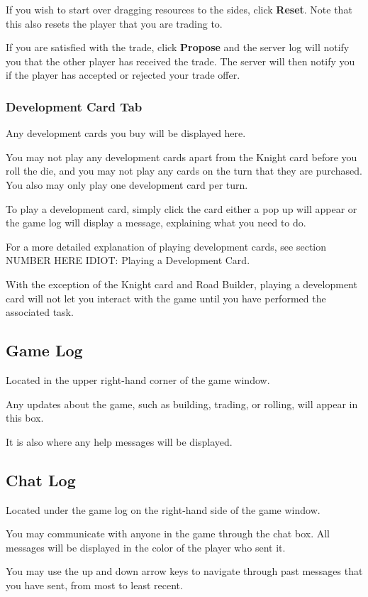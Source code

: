 \documentclass[12pt,letterpaper,titlepage]{article}
\begin{document}
		If you wish to start over dragging resources to the sides, click \textbf{Reset}. Note that this also resets the player that you are trading to.
		
		If you are satisfied with the trade, click \textbf{Propose} and the server log will notify you that the other player has received the trade. The server will then notify you if the player has accepted or rejected your trade offer.
		
		\subsubsection{Development Card Tab}
		Any development cards you buy will be displayed here.
		
		You may not play any development cards apart from the Knight card before you roll the die, and you may not play any cards on the turn that they are purchased. You also may only play one development card per turn.
		
		To play a development card, simply click the card either a pop up will appear or the game log will display a message, explaining what you need to do.
		
		For a more detailed explanation of playing development cards, see section NUMBER HERE IDIOT: Playing a Development Card.
		
		With the exception of the Knight card and Road Builder, playing a development card will not let you interact with the game until you have performed the associated task.
	
	\subsection{Game Log}
	Located in the upper right-hand corner of the game window.
	
	Any updates about the game, such as building, trading, or rolling, will appear in this box.
	
	It is also where any help messages will be displayed.
	
	\subsection{Chat Log}
	Located under the game log on the right-hand side of the game window.
	
	You may communicate with anyone in the game through the chat box. All messages will be displayed in the color of the player who sent it.
	
	You may use the up and down arrow keys to navigate through past messages that you have sent, from most to least recent.
	
\end{document}

